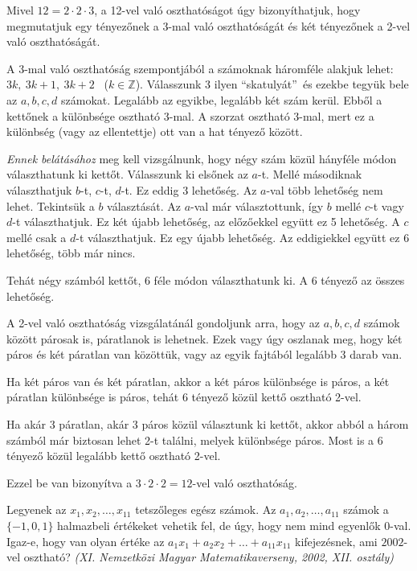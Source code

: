 \begin{solution}
	Mivel $12=2\cdot2\cdot3$, a 12-vel való oszthatóságot úgy bizonyíthatjuk,
	hogy megmutatjuk egy tényezőnek a 3-mal való oszthatóságát és két
	tényezőnek a 2-vel való oszthatóságát.
	
	A 3-mal való oszthatóság szempontjából a számoknak háromféle alakjuk
	lehet: $3k,\ 3k+1,\ 3k+2$ \ ($k\in\mathbb{Z}$). Válasszunk 3 ilyen
	``skatulyát''\ és ezekbe tegyük bele az $a,b,c,d$ számokat. Legalább
	az egyikbe, legalább két szám kerül. Ebből a kettőnek a különbsége
	osztható 3-mal. A szorzat osztható 3-mal, mert ez a különbség (vagy
	az ellentettje) ott van a hat tényező között.
	
	\textit{Ennek belátásához} meg kell vizsgálnunk, hogy négy szám közül
	hányféle módon választhatunk ki kettőt. Válasszunk ki elsőnek az $a$-t.
	Mellé másodiknak választhatjuk $b$-t, $c$-t, $d$-t. Ez eddig 3
	lehetőség. Az $a$-val több lehetőség nem lehet. Tekintsük a $b$
	választását. Az $a$-val már választottunk, így $b$ mellé $c$-t
	vagy $d$-t választhatjuk. Ez két újabb lehetőség, az előzőekkel együtt
	ez 5 lehetőség. A $c$ mellé csak a $d$-t választhatjuk. Ez egy újabb
	lehetőség. Az eddigiekkel együtt ez 6 lehetőség, több már nincs.
	
	Tehát négy számból kettőt, 6 féle módon választhatunk ki. A 6 tényező
	az összes lehetőség.
	
	A 2-vel való oszthatóság vizsgálatánál gondoljunk arra, hogy az $a,b,c,d$
	számok között párosak is, páratlanok is lehetnek. Ezek vagy úgy oszlanak
	meg, hogy két páros és két páratlan van közöttük, vagy az egyik fajtából
	legalább 3 darab van.
	
	Ha két páros van és két páratlan, akkor a két páros különbsége is
	páros, a két páratlan különbsége is páros, tehát 6 tényező közül kettő
	osztható 2-vel.
	
	Ha akár 3 páratlan, akár 3 páros közül választunk ki kettőt, akkor
	abból a három számból már biztosan lehet 2-t találni, melyek különbsége
	páros. Most is a 6 tényező közül legalább kettő osztható 2-vel.
	
	Ezzel be van bizonyítva a $3\cdot2\cdot2=12$-vel való oszthatóság.
\end{solution}
\begin{extraproblem}
	Legyenek az $x_{1},x_{2},\dots,x_{11}$ tetszőleges egész számok.
	Az $a_{1},a_{2},\dots,a_{11}$ számok a $\{-1,0,1\}$ halmazbeli értékeket
	vehetik fel, de úgy, hogy nem mind egyenlők 0-val. Igaz-e, hogy van
	olyan értéke az $a_{1}x_{1}+a_{2}x_{2}+\dots+a_{11}x_{11}$ kifejezésnek,
	ami $2002$-vel osztható?\textit{ (XI. Nemzetközi Magyar Matematikaverseny,
		2002, XII. osztály)} 
\end{extraproblem}

